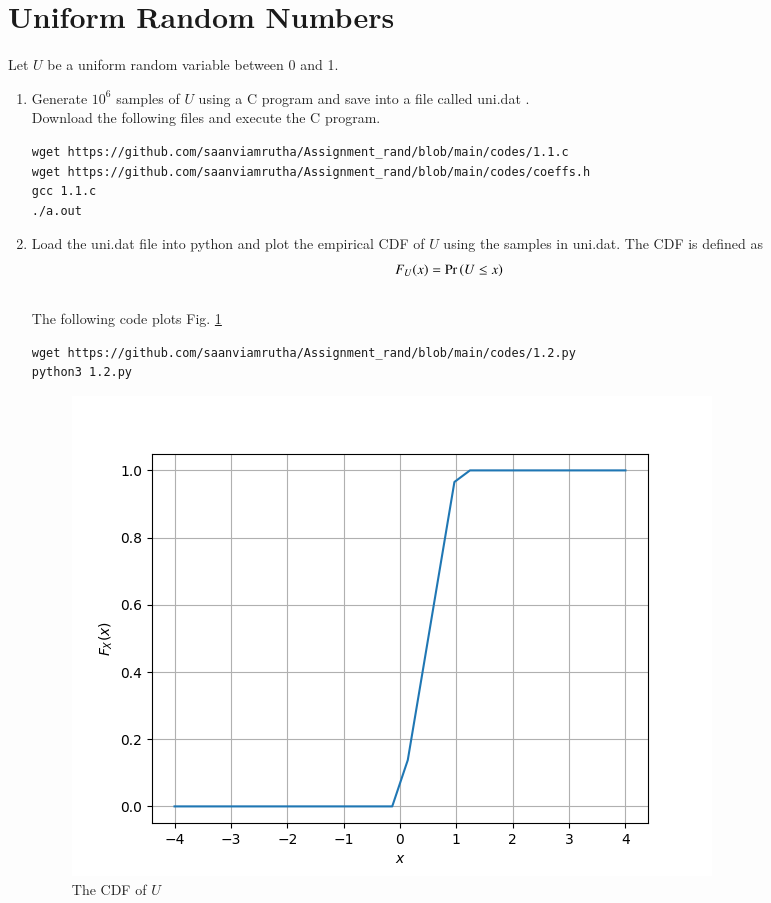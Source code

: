 \documentclass[journal,12pt,twocolumn]{IEEEtran}
\renewcommand\thesection{\arabic{section}}
\begin{document}
\section{Uniform Random Numbers}
Let $U$ be a uniform random variable between 0 and 1.
\begin{enumerate}[label=\thesection.\arabic*
,ref=\thesection.\theenumi]
\item Generate $10^6$ samples of $U$ using a C program and save into a file called uni.dat .
\\
\solution Download the following files and execute the  C program.
\begin{lstlisting}
wget https://github.com/saanviamrutha/Assignment_rand/blob/main/codes/1.1.c
wget https://github.com/saanviamrutha/Assignment_rand/blob/main/codes/coeffs.h
gcc 1.1.c
./a.out
\end{lstlisting}
%
\item
Load the uni.dat file into python and plot the empirical CDF of $U$ using the samples in uni.dat. The CDF is defined as
\begin{align}
F_{U}(x) = \Pr\left(U \le x\right)
\end{align}
\\
\solution  The following code plots Fig. \ref{fig:uni_cdf}
\begin{lstlisting}
wget https://github.com/saanviamrutha/Assignment_rand/blob/main/codes/1.2.py
python3 1.2.py
\end{lstlisting}
\begin{figure}
\centering
\includegraphics[width=\columnwidth]{./figures/cdf.png}
\caption{The CDF of $U$}
\label{fig:uni_cdf}
\end{figure}

\end{enumerate}
\end{document}
